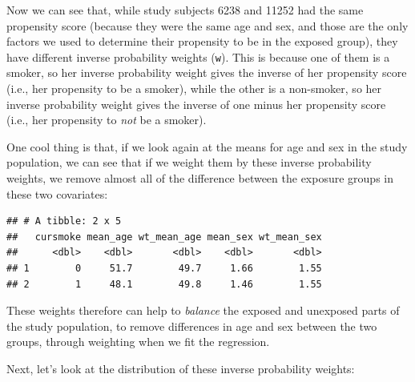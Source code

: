\documentclass[
]{book}
\newenvironment{Shaded}{\begin{snugshade}}{\end{snugshade}}
\newcommand{\DataTypeTok}[1]{\textcolor[rgb]{0.13,0.29,0.53}{#1}}
\newcommand{\KeywordTok}[1]{\textcolor[rgb]{0.13,0.29,0.53}{\textbf{#1}}}
\newcommand{\NormalTok}[1]{#1}
\newcommand{\OperatorTok}[1]{\textcolor[rgb]{0.81,0.36,0.00}{\textbf{#1}}}
\newcommand{\StringTok}[1]{\textcolor[rgb]{0.31,0.60,0.02}{#1}}
\begin{document}
Now we can see that, while study subjects 6238 and 11252 had the same propensity score (because they were the same age and sex, and those are the only factors we used to determine their propensity to be in the exposed group), they have different inverse probability weights (\texttt{w}). This is because one of them is a smoker, so her inverse probability weight gives the inverse of her propensity score (i.e., her propensity to be a smoker), while the other is a non-smoker, so her inverse probability weight gives the inverse of one minus her propensity score (i.e., her propensity to \emph{not} be a smoker).

One cool thing is that, if we look again at the means for age and sex in the study population, we can see that if we weight them by these inverse probability weights, we remove almost all of the difference between the exposure groups in these two covariates:

\begin{Shaded}
\end{Shaded}

\begin{verbatim}
## # A tibble: 2 x 5
##   cursmoke mean_age wt_mean_age mean_sex wt_mean_sex
##      <dbl>    <dbl>       <dbl>    <dbl>       <dbl>
## 1        0     51.7        49.7     1.66        1.55
## 2        1     48.1        49.8     1.46        1.55
\end{verbatim}

These weights therefore can help to \emph{balance} the exposed and unexposed parts of the study population, to remove differences in age and sex between the two groups, through weighting when we fit the regression.

Next, let's look at the distribution of these inverse probability weights:

\begin{Shaded}
\end{Shaded}
\end{document}
